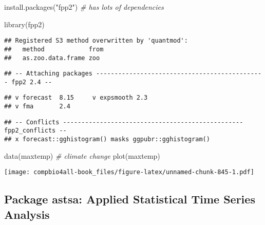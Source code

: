 \documentclass[
]{book}
\newenvironment{Shaded}{\begin{snugshade}}{\end{snugshade}}
\newcommand{\CommentTok}[1]{\textcolor[rgb]{0.56,0.35,0.01}{\textit{#1}}}
\newcommand{\FunctionTok}[1]{\textcolor[rgb]{0.00,0.00,0.00}{#1}}
\newcommand{\NormalTok}[1]{#1}
\newcommand{\StringTok}[1]{\textcolor[rgb]{0.31,0.60,0.02}{#1}}
\begin{document}
\begin{Shaded}
\begin{Highlighting}[]
\FunctionTok{install.packages}\NormalTok{(}\StringTok{"fpp2"}\NormalTok{) }\CommentTok{\# has lots of dependencies}
\end{Highlighting}
\end{Shaded}

\begin{Shaded}
\begin{Highlighting}[]
\FunctionTok{library}\NormalTok{(fpp2)}
\end{Highlighting}
\end{Shaded}

\begin{verbatim}
## Registered S3 method overwritten by 'quantmod':
##   method            from
##   as.zoo.data.frame zoo
\end{verbatim}

\begin{verbatim}
## -- Attaching packages ---------------------------------------------- fpp2 2.4 --
\end{verbatim}

\begin{verbatim}
## v forecast  8.15     v expsmooth 2.3 
## v fma       2.4
\end{verbatim}

\begin{verbatim}
## -- Conflicts ------------------------------------------------- fpp2_conflicts --
## x forecast::gghistogram() masks ggpubr::gghistogram()
\end{verbatim}

\begin{Shaded}
\begin{Highlighting}[]
\FunctionTok{data}\NormalTok{(maxtemp) }\CommentTok{\# climate change}
\FunctionTok{plot}\NormalTok{(maxtemp)}
\end{Highlighting}
\end{Shaded}

\texttt{[image: compbio4all-book\_files/figure-latex/unnamed-chunk-845-1.pdf]}

\hypertarget{package-astsa-applied-statistical-time-series-analysis}{%
\subsection{Package astsa: Applied Statistical Time Series Analysis}\label{package-astsa-applied-statistical-time-series-analysis}}
\end{document}
